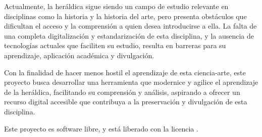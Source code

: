 Actualmente, la heráldica sigue siendo un campo de estudio relevante en disciplinas
como la historia y la historia del arte, pero presenta obstáculos que dificultan el 
acceso y la comprensión a quien desea introducirse a ella. La falta de una completa
digitalización y estandarización de esta disciplina, y la ausencia de tecnologías
actuales que faciliten su estudio, resulta en barreras para su aprendizaje, 
aplicación académica y divulgación.

Con la finalidad de hacer menos hostil el aprendizaje de esta ciencia-arte, este
proyecto busca desarrollar una herramienta que modernice y agilice el aprendizaje
de la heráldica, facilitando su comprensión y análisis, aspirando a ofrecer un 
recurso digital accesible que contribuya a la preservación y divulgación de esta 
disciplina.

Este proyecto es software libre, y está liberado con la licencia \cite{gplv3}.